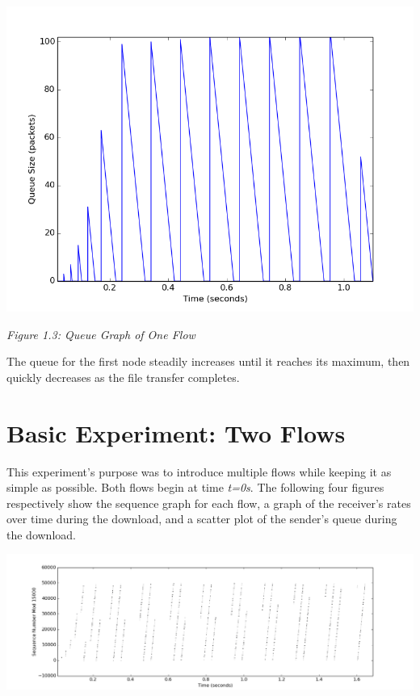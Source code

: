 \documentclass[11pt]{article}
\begin{document}
\includegraphics[width=17cm]{outputs/oneflow/oneflow_queue.png}

\centerline{\emph{Figure 1.3: Queue Graph of One Flow}}

The queue for the first node steadily increases until it reaches its maximum, then quickly decreases as the file transfer completes.




\section{Basic Experiment: Two Flows}

This experiment's purpose was to introduce multiple flows while keeping it as simple as possible. Both flows begin at time \emph{t=0s}. The following four figures respectively show the sequence graph for each flow, a graph of the receiver's rates over time during the download, and a scatter plot of the sender's queue during the download.

\includegraphics[width=17cm]{outputs/twoflows/twoflows_sequence1.png}
\end{document}
